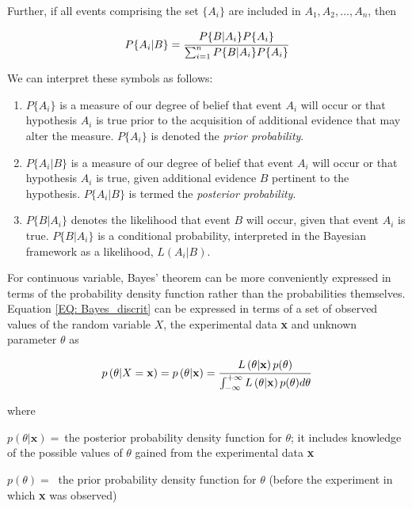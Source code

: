 \documentclass[a4paper,fleqn]{cas-dc}
\begin{document}
Further, if all events comprising the set $\{A_i\}$ are included in $A_1,A_2,...,A_n$, then

{\footnotesize
\begin{equation} \label{EQ: Bayes_discrit}
	P\{A_i|B\} = \cfrac{P\{B|A_i\}P\{A_i\}}{ \sum_{i=1}^{n} P\{B|A_i\} P\{A_i\} }
\end{equation} }

We can interpret these symbols as follows:

\begin{enumerate}
	\item $P\{A_i\}$ is a measure of our degree of belief that event $A_i$ will occur or that hypothesis $A_i$ is true prior to the acquisition of additional evidence that may alter the measure. $P\{A_i\}$ is denoted the \textit{prior probability}.
	\item $P\{A_i|B\}$ is a measure of our degree of belief that event $A_i$ will occur or that hypothesis $A_i$ is true, given additional evidence $B$ pertinent to the hypothesis. $P\{A_i|B\}$ is termed the \textit{posterior probability}.
	\item $P\{B|A_i\}$ denotes the likelihood that event $B$ will occur, given that event $A_i$ is true. $P\{B|A_i\}$ is a conditional probability, interpreted in the Bayesian framework as a likelihood, $L(A_i|B)$.
\end{enumerate}

For continuous variable, Bayes' theorem can be more conveniently expressed in terms of the probability density function rather than the probabilities themselves. Equation \ref{EQ: Bayes_discrit} can be expressed in terms of a set of observed values of the random variable $X$, the experimental data \textbf{x} and unknown parameter $\theta$ as

{\footnotesize
\begin{equation} \label{EQ: Bayes_continous}
	p\left( \theta|X=\textbf{x} \right) = p\left( \theta|\textbf{x} \right) = \cfrac{L\left( \theta|\textbf{x} \right) p(\theta)}{\int_{-\infty}^{+\infty} L\left( \theta|\textbf{x} \right) p(\theta) d\theta}
\end{equation} }

where

$p(\theta|\textbf{x}) = ~$the posterior probability density function for $\theta$; it includes knowledge of the possible values of $\theta$ gained from the experimental data \textbf{x}

$p(\theta) = ~$ the prior probability density function for $\theta$ (before the experiment in which \textbf{x} was observed)
\end{document}
